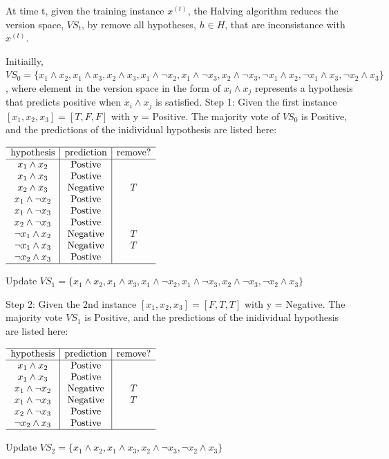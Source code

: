 \documentclass[paper=a4, fontsize=11pt]{scrartcl} %
\numberwithin{equation}{section} %
\numberwithin{figure}{section} %
\numberwithin{table}{section} %
\begin{document}
At time t, given the training instance $x^{(t)}$, the Halving algorithm reduces the version space, $VS_t$, by remove all hypotheses, $h \in H$, that are inconsistance with $x^{(t)}$. 
\bigbreak

Initiailly, $VS_0 = 
\{
x_1 \land x_2, x_1 \land x_3, x_2 \land x_3,
x_1 \land \neg x_2, x_1 \land \neg x_3, x_2 \land \neg x_3,
\neg x_1 \land x_2, \neg x_1 \land x_3, \neg x_2 \land x_3
\}$, where element in the version space in the form of $x_i \land x_j$ represents a hypothesis that predicts positive when $x_i \land x_j$ is satisfied. 
\bigbreak
Step 1: Given the first instance $[x_1,x_2,x_3] = [T,F,F]$ with y = Positive. The majority vote of $VS_0$ is Positive, and the predictions of the inidividual hypothesis are listed here: 

\begin{center}
$
\begin{array}{c|c|c}
\hline
\text{hypothesis} & \text{prediction} & \text{remove?} \\
\hline
x_1 \land x_2 & \text{Postive} & \\ 
x_1 \land x_3 & \text{Postive} & \\ 
x_2 \land x_3 & \text{Negative} & T \\ 
x_1 \land \neg x_2 & \text{Postive} & \\ 
x_1 \land \neg x_3 & \text{Postive} & \\ 
x_2 \land \neg x_3 & \text{Postive} & \\ 
\neg x_1 \land x_2 & \text{Negative} & T \\ 
\neg x_1 \land x_3 & \text{Negative} & T \\ 
\neg x_2 \land x_3 & \text{Postive} &  \\ 
\hline
\end{array}
$
\end{center}

Update $VS_1 = 
\{
x_1 \land x_2, x_1 \land x_3, 
x_1 \land \neg x_2, x_1 \land \neg x_3, x_2 \land \neg x_3,
\neg x_2 \land x_3
\}$

\smallbreak
Step 2: Given the 2nd instance $[x_1,x_2,x_3] = [F,T,T]$ with y = Negative. The majority vote $VS_1$ is Positive, and the predictions of the inidividual hypothesis are listed here: 
\begin{center}
$
\begin{array}{c|c|c}
\hline
\text{hypothesis} & \text{prediction} & \text{remove?} \\
\hline
x_1 \land x_2 & \text{Postive} & \\ 
x_1 \land x_3 & \text{Postive} & \\ 
x_1 \land \neg x_2 & \text{Negative} & T \\ 
x_1 \land \neg x_3 & \text{Negative} & T \\ 
x_2 \land \neg x_3 & \text{Postive} & \\ 
\neg x_2 \land x_3 & \text{Postive} &  \\ 
\hline
\end{array}
$
\end{center}
Update $VS_2 = 
\{
x_1 \land x_2, x_1 \land x_3, 
x_2 \land \neg x_3,
\neg x_2 \land x_3
\}$
\end{document}
